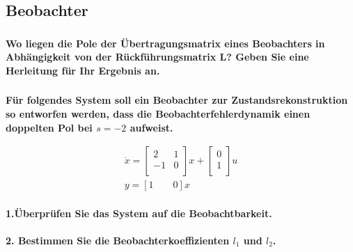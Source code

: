 \subsection{Beobachter}
\subsubsection{}
\textbf{Wo liegen die Pole der Übertragungsmatrix eines Beobachters in Abhängigkeit von der Rückführungsmatrix L? Geben Sie eine Herleitung für Ihr Ergebnis an.}

\subsubsection{}
\textbf{Für folgendes System soll ein Beobachter zur Zustandsrekonstruktion so entworfen werden, dass die Beobachterfehlerdynamik einen doppelten Pol bei $s=-2$ aufweist.}

\begin{equation}
    \begin{array}{l}
        \dot{x}=\left[\begin{array}{cc}
                2  & 1 \\
                -1 & 0 \\
            \end{array}\right]x+\left[\begin{array}{c}
                0 \\
                1 \\
            \end{array}\right]u \\
        y=\left[1\qquad 0\right]x
    \end{array}
\end{equation}
\paragraph{1.Überprüfen Sie das System auf die Beobachtbarkeit.}

\paragraph{2. Bestimmen Sie die Beobachterkoeffizienten $l_1$ und $l_2$.
}